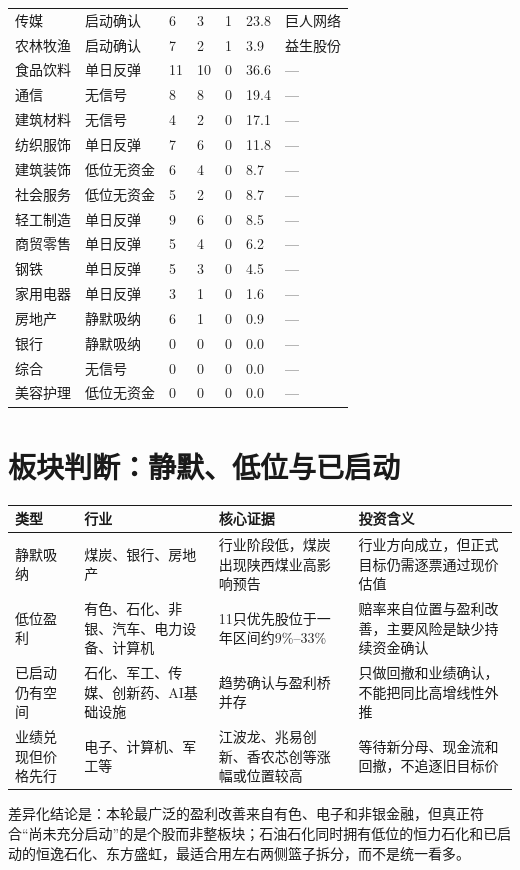 \begin{longtable}{L{1.8cm}L{1.55cm}R{1.05cm}R{1.05cm}R{1.05cm}R{1.25cm}L{4.1cm}}
传媒 & 启动确认 & 6 & 3 & 1 & 23.8 & 巨人网络 \\
农林牧渔 & 启动确认 & 7 & 2 & 1 & 3.9 & 益生股份 \\
食品饮料 & 单日反弹 & 11 & 10 & 0 & 36.6 & --- \\
通信 & 无信号 & 8 & 8 & 0 & 19.4 & --- \\
建筑材料 & 无信号 & 4 & 2 & 0 & 17.1 & --- \\
纺织服饰 & 单日反弹 & 7 & 6 & 0 & 11.8 & --- \\
建筑装饰 & 低位无资金 & 6 & 4 & 0 & 8.7 & --- \\
社会服务 & 低位无资金 & 5 & 2 & 0 & 8.7 & --- \\
轻工制造 & 单日反弹 & 9 & 6 & 0 & 8.5 & --- \\
商贸零售 & 单日反弹 & 5 & 4 & 0 & 6.2 & --- \\
钢铁 & 单日反弹 & 5 & 3 & 0 & 4.5 & --- \\
家用电器 & 单日反弹 & 3 & 1 & 0 & 1.6 & --- \\
房地产 & 静默吸纳 & 6 & 1 & 0 & 0.9 & --- \\
银行 & 静默吸纳 & 0 & 0 & 0 & 0.0 & --- \\
综合 & 无信号 & 0 & 0 & 0 & 0.0 & --- \\
美容护理 & 低位无资金 & 0 & 0 & 0 & 0.0 & --- \\
\bottomrule
\end{longtable}
\normalsize
{}

\section{板块判断：静默、低位与已启动}

\begin{exhibitbox}
\begin{tabularx}{\textwidth}{L{2.2cm}L{3.0cm}L{3.4cm}X}
\toprule
\textbf{类型} & \textbf{行业} & \textbf{核心证据} & \textbf{投资含义} \\
\midrule
静默吸纳 & 煤炭、银行、房地产 & 行业阶段低，煤炭出现陕西煤业高影响预告 & 行业方向成立，但正式目标仍需逐票通过现价估值 \\
低位盈利 & 有色、石化、非银、汽车、电力设备、计算机 & 11只优先股位于一年区间约9\%--33\% & 赔率来自位置与盈利改善，主要风险是缺少持续资金确认 \\
已启动仍有空间 & 石化、军工、传媒、创新药、AI基础设施 & 趋势确认与盈利桥并存 & 只做回撤和业绩确认，不能把同比高增线性外推 \\
业绩兑现但价格先行 & 电子、计算机、军工等 & 江波龙、兆易创新、香农芯创等涨幅或位置较高 & 等待新分母、现金流和回撤，不追逐旧目标价 \\
\bottomrule
\end{tabularx}
\end{exhibitbox}

差异化结论是：本轮最广泛的盈利改善来自有色、电子和非银金融，但真正符合“尚未充分启动”的是个股而非整板块；石油石化同时拥有低位的恒力石化和已启动的恒逸石化、东方盛虹，最适合用左右两侧篮子拆分，而不是统一看多。
